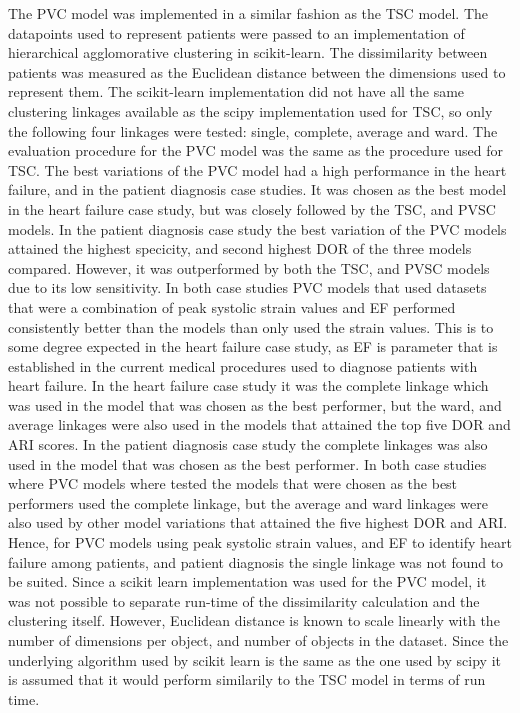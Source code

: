The PVC model was implemented in a similar fashion as the TSC model.
The datapoints used to represent patients were passed to an implementation of hierarchical agglomorative clustering in scikit-learn.
The dissimilarity between patients was measured as the Euclidean distance between the dimensions used to represent them.
The scikit-learn implementation did not have all the same clustering linkages available as the scipy implementation used for TSC, so only the following four linkages were tested: single, complete, average and ward.
The evaluation procedure for the PVC model was the same as the procedure used for TSC.
The best variations of the PVC model had a high performance in the heart failure, and in the patient diagnosis case studies. 
It was chosen as the best model in the heart failure case study, but was closely followed by the TSC, and PVSC models.
In the patient diagnosis case study the best variation of the PVC models attained the highest specicity, and second highest DOR of the three models compared. 
However, it was outperformed by both the TSC, and PVSC models due to its low sensitivity.
In both case studies PVC models that used datasets that were a combination of peak systolic strain values and EF performed consistently better than the models than only used the strain values. 
This is to some degree expected in the heart failure case study, as EF is parameter that is established in the current medical procedures used to diagnose patients with heart failure.
In the heart failure case study it was the complete linkage which was used in the model that was chosen as the best performer, but the ward, and average linkages were also used in the models that attained the top five DOR and ARI scores.
In the patient diagnosis case study the complete linkages was also used in the model that was chosen as the best performer.
In both case studies where PVC models where tested the models that were chosen as the best performers used the complete linkage, but the average and ward linkages were also used by other model variations that attained the five highest DOR and ARI.
Hence, for PVC models using peak systolic strain values, and EF to identify heart failure among patients, and patient diagnosis the single linkage was not found to be suited.
Since a scikit learn implementation was used for the PVC model, it was not possible to separate run-time of the dissimilarity calculation and the clustering itself.  
However, Euclidean distance is known to scale linearly with the number of dimensions per object, and number of objects in the dataset.
Since the underlying algorithm used by scikit learn is the same as the one used by scipy it is assumed that it would perform similarily to the TSC model in terms of run time.

